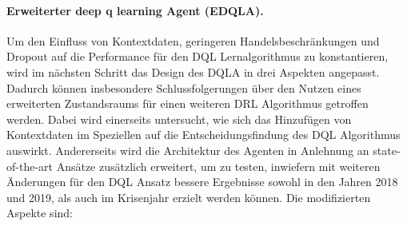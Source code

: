 \paragraph{Erweiterter deep q learning Agent (\acs{EDQLA}).}
Um den Einfluss von Kontextdaten, geringeren Handelsbeschränkungen und Dropout auf die Performance für den \acs{DQL} Lernalgorithmus zu konstantieren, wird im nächsten Schritt das Design des \acs{DQLA} in drei Aspekten angepasst.
Dadurch können insbesondere Schlussfolgerungen über den Nutzen eines erweiterten Zustandsraums für einen weiteren \acs{DRL} Algorithmus getroffen werden.
Dabei wird einerseits untersucht, wie sich das Hinzufügen von Kontextdaten im Speziellen auf die Entscheidungsfindung des \acs{DQL} Algorithmus auswirkt.
Andererseits wird die Architektur des Agenten in Anlehnung an state-of-the-art Ansätze \parencite{improvementaction,théate2020application,direct} zusätzlich erweitert, um zu testen, inwiefern mit weiteren Änderungen für den \acs{DQL} Ansatz bessere Ergebnisse sowohl in den Jahren 2018 und 2019, als auch im Krisenjahr erzielt werden können.
Die modifizierten Aspekte sind:

